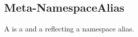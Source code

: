 \subsection{Meta-NamespaceAlias}
\label{concept-Meta-NamespaceAlias}

A  is a  and a 
reflecting a namespace alias.


